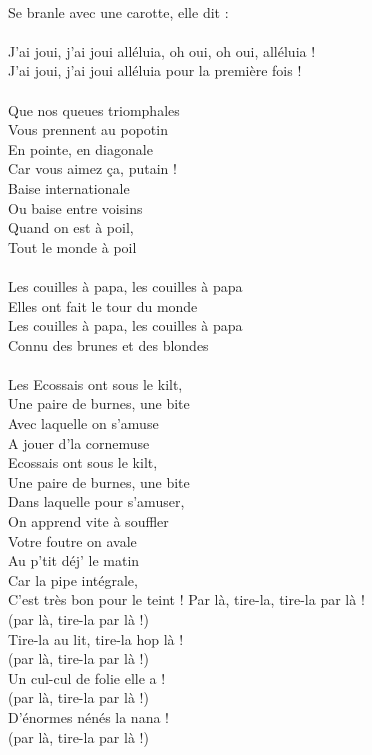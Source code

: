 \\Se branle avec une carotte, elle dit :
\\\\J'ai joui, j'ai joui alléluia, oh oui, oh oui, alléluia !
\\J'ai joui, j'ai joui alléluia pour la première fois !
\\\\Que nos queues triomphales
\\Vous prennent au popotin
\\En pointe, en diagonale
\\Car vous aimez ça, putain !
\\Baise internationale
\\Ou baise entre voisins
\\Quand on est à poil,
\\Tout le monde à poil
\\\\Les couilles à papa, les couilles à papa
\\Elles ont fait le tour du monde
\\Les couilles à papa, les couilles à papa
\\Connu des brunes et des blondes
\\\\Les Ecossais ont sous le kilt,
\\Une paire de burnes, une bite
\\Avec laquelle on s'amuse
\\A jouer d'la cornemuse
\\Ecossais ont sous le kilt,
\\Une paire de burnes, une bite
\\Dans laquelle pour s'amuser,
\\On apprend vite à souffler
\\Votre foutre on avale
\\Au p'tit déj' le matin
\\Car la pipe intégrale,
\\C'est très bon pour le teint !
\breakpage
Par là, tire-la, tire-la par là !
\\(par là, tire-la par là !)
\\Tire-la au lit, tire-la hop là !
\\(par là, tire-la par là !)
\\Un cul-cul de folie elle a !
\\(par là, tire-la par là !)
\\D'énormes nénés la nana !
\\(par là, tire-la par là !)

